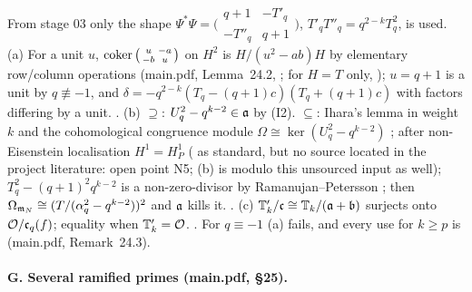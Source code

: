 \begin{outline}
From stage 03 only the shape $\Psi^*\Psi=\big(\begin{smallmatrix}q+1&-T'_q\\-T''_q&q+1\end{smallmatrix}\big)$, $T'_qT''_q=q^{2-k}T_q^2$, is used.
(a) For a unit $u$, $\operatorname{coker}\big(\begin{smallmatrix}u&-a\\-b&u\end{smallmatrix}\big)$ on $H^2$ is $H/(u^2-ab)H$ by elementary row/column
operations (main.pdf, Lemma~24.2, \stproved; \stformal{} for $H=T$ only, ); $u=q+1$ is a unit by
$q\not\equiv-1$, and $\delta=-q^{2-k}(T_q-(q+1)c)(T_q+(q+1)c)$ with factors differing by a unit. \stproved.
(b) $\supseteq$: $U_q^2-q^{k-2}\in\mathfrak{a}$ by (I2). $\subseteq$: Ihara's lemma in weight $k$ \cite[Lemma~3.2, p.~210]{Dia91} \stcited{} and the
cohomological congruence module $\Omega\cong\ker(U_q^2-q^{k-2})$ \cite[\S2]{Dia91} \stcited; after non-Eisenstein localisation
$H^1=H^1_P$ (\stknown{} as standard, but no source located in the project literature: open point N5; (b) is \stpmc{} modulo this unsourced input as well); $T_q^2-(q+1)^2q^{k-2}$ is a non-zero-divisor by
Ramanujan--Petersson \cite[Thm~5.6]{Del69} \stcited; then $\Omega_{\mathfrak{m}_N}\cong(T/(\alpha_q^2-q^{k-2}))^2$ and $\mathfrak{a}$ kills it. \stpmc.
(c) $\mathbb{T}'_k/\mathfrak{c}\cong\mathbb{T}_k/(\mathfrak{a}+\mathfrak{b})$ surjects onto $\mathcal{O}/\mathfrak{c}_q(f)$; equality when $\mathbb{T}'_k=\mathcal{O}$. \stpmc. For $q\equiv-1$ (a) fails, and every use
for $k\ge p$ is \stexp{} (main.pdf, Remark~24.3).
\end{outline}

\paragraph{G. Several ramified primes (main.pdf, \S25).}

